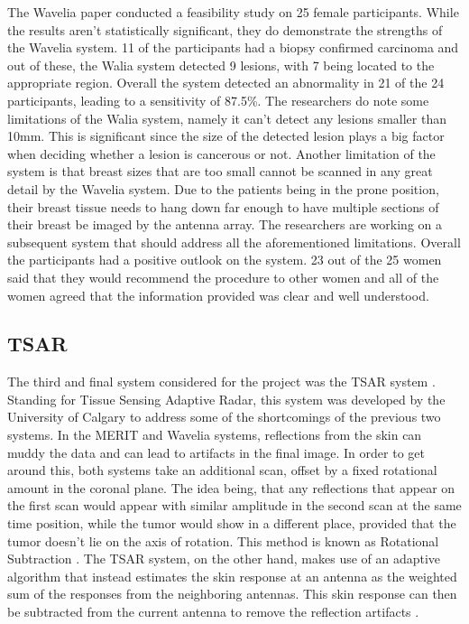 \noindent The Wavelia paper \cite{moloneyWaveliaMicrowaveBreast2021} conducted a feasibility study on 25 female
participants. While the results aren't statistically significant, they do demonstrate the strengths of the Wavelia
system. 11 of the participants had a biopsy confirmed carcinoma and out of these, the Walia system detected 9 lesions,
with 7 being located to the appropriate region. Overall the system detected an abnormality in 21 of the 24 participants,
leading to a sensitivity of 87.5\%. The researchers do note some limitations of the Walia system, namely it can't detect
any lesions smaller than 10mm. This is significant since the size of the detected lesion plays a big factor when
deciding whether a lesion is cancerous or not. Another limitation of the system is that breast sizes that are too small
cannot be scanned in any great detail by the Wavelia system. Due to the patients being in the prone position, their
breast tissue needs to hang down far enough to have multiple sections of their breast be imaged by the antenna array.
The researchers are working on a subsequent system that should address all the aforementioned limitations. Overall the
participants had a positive outlook on the system. 23 out of the 25 women said that they would recommend the procedure
to other women and all of the women agreed that the information provided was clear and well understood.

\subsection{TSAR}
The third and final system considered for the project was the TSAR system \cite{e.c.fearMicrowaveBreastImaging2013}. Standing for Tissue Sensing Adaptive Radar,
this system was developed by the University of Calgary to address some of the shortcomings of the previous two systems.
In the MERIT and Wavelia systems, reflections from the skin can muddy the data and can lead to artifacts in the final
image. In order to get around this, both systems take an additional scan, offset by a fixed rotational amount in the
coronal plane. The idea being, that any reflections that appear on the first scan would appear with similar amplitude in
the second scan at the same time position, while the tumor would show in a different place, provided that the tumor
doesn't lie on the axis of rotation. This method is known as Rotational Subtraction
\cite{klemmImprovedDelayandSumBeamforming2008}. The TSAR system, on the other hand, makes use of an adaptive algorithm
that instead estimates the skin response at an antenna as the weighted sum of the responses from the neighboring
antennas. This skin response can then be subtracted from the current antenna to remove the reflection artifacts
\cite{makladNeighborhoodBasedAlgorithmFacilitate2012}. \hfill \break

